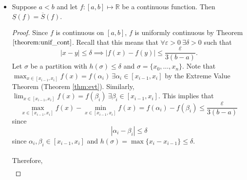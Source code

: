 \documentclass{article}
\newcommand{\R}{\mathbb{R}}
\newcommand{\?}{\stackrel{?}{=}}
\theoremstyle{definition} %
\begin{document}
\begin{itemize}
\begin{lemma}
        $$\overline{S}_{\sigma_*}(f) \leq \overline{S}_{\sigma}(f) \quad \text{and} \quad \underline{S}_{\sigma} \leq \underline{S}_{\sigma_{*}}(f).$$
    \end{lemma}
    \begin{proof}
        Consider $\sigma = \{x_0, \ldots, x_n\}$ and $\sigma_* = \{x_0^*, \ldots, x_{n}^*\}$. Let $x_{i - 1}^j$ be the point in $\sigma_*$ such that
        $$x_{i - 1} \leq x_{i - 1}^j \leq x_i \quad j = 0, \ldots, k_i.$$
        Then
        \begin{align*}
            \underline{S}_{\sigma}(f) &= \sum_{i = 1}^n \left(\min_{x \in [x_{i - 1}, x_i]} f(x)\right)(x_i - x_{i - 1}) \\
            &\leq \sum_{i = 1}^n \sum_{j = 1}^{k_i} \min_{x \in [x_{i - 1}^j, x_{i}^j]} (x_{i - 1}^j - x_{i - 1}^{j - 1}) \\
            &= \sum_{i = 1}^{n_*} \min_{x \in [x_{i - 1}^*, x_i^*]} f(x) (x_i^* - x_{i - 1}^*) = \underline{S}_{\sigma_*}(f).
        \end{align*}
    \end{proof}
    \item[]
    \begin{lemma}
        Suppose $a < b$ and let $f: [a, b] \mapsto \R$ be a continuous function. Then $\underline{S}(f) = \overline{S}(f)$.
    \end{lemma}
    \begin{proof}
        Since $f$ is continuous on $[a, b]$, $f$ is uniformly continuous by Theorem $\ref{theorem:unif_cont}$. Recall that this means that $\forall \varepsilon > 0 \ \exists \delta > 0$ such that
        $$|x - y| \leq \delta \implies |f(x) - f(y)| \leq \frac{\varepsilon}{3(b - a)}.$$
        Let $\sigma$ be a partition with $h(\sigma) \leq \delta$ and $\sigma = \{x_0, \ldots, x_n\}$. Note that $\max_{x \in [x_{i - 1}, x_i]} f(x) = f(\alpha_i) \ \exists \alpha_i \in [x_{i - 1}, x_i]$ by the Extreme Value Theorem (Theorem \ref{thm:evt}). Similarly, $\lim_{x \in [x_{i - 1}, x_i]} f(x) = f(\beta_i) \ \exists \beta_i \in [x_{i - 1}, x_i]$. This implies that
        $$\max_{x \in [x_{i - 1}, x_i]} f(x) - \min_{x \in [x_{i - 1}, x_i]} f(x) = f(\alpha_i) - f(\beta_i) \leq \frac{\varepsilon}{3(b - a)}$$
        since
        $$|\alpha_i - \beta_i| \leq \delta$$
        since $\alpha_i, \beta_i \in [x_{i - 1}, x_i]$ and $h(\sigma) = \max\{x_i - x_{i - 1}\} \leq \delta$. \\\\
        Therefore,
        \begin{align*}

\end{align*}
\end{proof}
\end{itemize}
\end{document}
